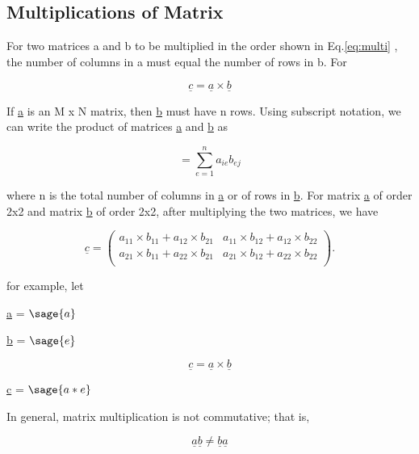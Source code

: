 \documentclass[12pt]{report}
\newcommand{\lab}[1]{
Eq.\ref{#1}
}
\begin{document}
\subsection{Multiplications of Matrix}
For two matrices a and b to be multiplied in the order shown in \lab{eq:multi}, the number of columns in a must equal the number of rows in b. For

\begin{equation}\underline{c} = \underline{a} \times \underline{b}\label{eq:multi}\end{equation}

If \underline{a} is an M x N matrix, then \underline{b} must have n
rows. Using subscript notation, we can write the product of matrices
\underline{a} and \underline{b} as

\begin{equation}[c_{{ij}}] = \sum_{e=1}^{n} {a_{ie}}{b_{ej}}\end{equation}

where n is the total number of columns in \underline{a} or of rows in
\underline{b}. For matrix \underline{a} of order 2x2 and matrix
\underline{b} of order 2x2, after multiplying the two matrices, we
have

\begin{equation}\underline{c}=\left(\begin{array}{rrrrrr}
a_{11} \times b_{11} + a_{12} \times b_{21} & a_{11} \times b_{12} + a_{12} \times b_{22}\\
a_{21} \times b_{11} + a_{22} \times b_{21} & a_{21} \times b_{12} + a_{22} \times b_{22}\\
\end{array}\right).\end{equation}

for example, let 

\begin{center}
\underline{a} = $\sage{a}$

\underline{b} = $\sage{e}$


\[\underline{c} = \underline{a} \times \underline{b}\]


\underline{c} = $\sage{a*e}$
\end{center}

In general, matrix multiplication is not commutative; that is,

\begin{equation}\underline{a}\underline{b} \neq \underline{b}\underline{a} \end{equation}
\end{document}
